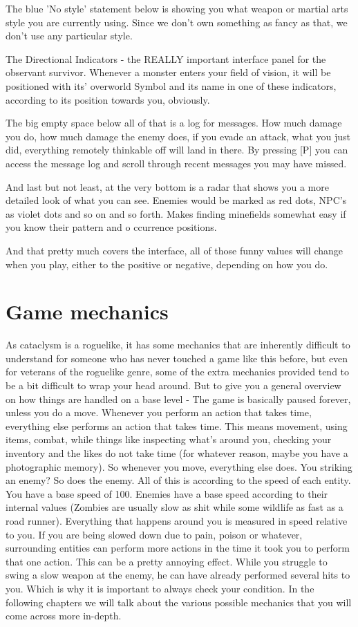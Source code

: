 \documentclass[11pt]{report}
\begin{document}
The blue 'No style' statement below is showing you what weapon or martial arts style you are currently using. Since we don't own something as fancy as that, we don't use any particular style.

The Directional Indicators - the REALLY important interface panel for the observant survivor. Whenever a monster enters your field of vision, it will be positioned with its' overworld Symbol and its name in one of these indicators, according to its position towards you, obviously.

The big empty space below all of that is a log for messages. How much damage you do, how much damage the enemy does, if you evade an attack, what you just did, everything remotely thinkable off will land in there. By pressing [P] you can access the message log and scroll through recent messages you may have missed.

And last but not least, at the very bottom is a radar that shows you a more detailed look of what you can see. Enemies would be marked as red dots, NPC's as violet dots and so on and so forth. Makes finding minefields somewhat easy if you know their pattern and o
ccurrence positions.

And that pretty much covers the interface, all of those funny values will change when you play, either to the positive or negative, depending on how you do.

\section{Game mechanics}

As cataclysm is a roguelike, it has some mechanics that are inherently difficult to understand for someone who has never touched a game like this before, but even for veterans of the roguelike genre, some of the extra mechanics provided tend to be a bit difficult to wrap your head around. But to give you a general overview on how things are handled on a base level - The game is basically paused forever, unless you do a move. Whenever you perform an action that takes time, everything else performs an action that takes time. This means movement, using items, combat, while things like inspecting what's around you, checking your inventory and the likes do not take time (for whatever reason, maybe you have a photographic memory). So whenever you move, everything else does. You striking an enemy? So does the enemy. All of this is according to the speed of each entity. You have a base speed of 100. Enemies have a base speed according to their internal values (Zombies are usually slow as shit while some wildlife as fast as a road runner). Everything that happens around you is measured in speed relative to you. If you are being slowed down due to pain, poison or whatever, surrounding entities can perform more actions in the time it took you to perform that one action. This can be a pretty annoying effect. While you struggle to swing a slow weapon at the enemy, he can have already performed several hits to you. Which is why it is important to always check your condition. In the following chapters we will talk about the various possible mechanics that you will come across more in-depth.
\end{document}
